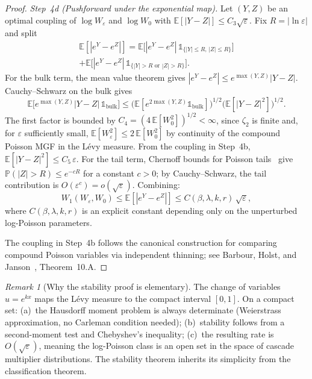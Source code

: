 \documentclass[12pt]{amsart}
\theoremstyle{definition}
\theoremstyle{remark}
\newtheorem*{remark}{Remark}
\begin{document}
\begin{proof}
\textit{Step~4d (Pushforward under the exponential map).}  Let
$(Y,Z)$ be an optimal coupling of $\log W_\varepsilon$ and
$\log W_0$ with
$\mathbb{E}[|Y-Z|] \leq C_3\sqrt{\varepsilon}$.
Fix $R = |\ln\varepsilon|$ and split
\begin{multline*}
  \mathbb{E}[|e^Y - e^Z|]
  = \mathbb{E}\bigl[|e^Y - e^Z|\,
    \mathds{1}_{\{|Y|\leq R,\,|Z|\leq R\}}\bigr] \\
  + \mathbb{E}\bigl[|e^Y - e^Z|\,
    \mathds{1}_{\{|Y|>R \text{ or } |Z|>R\}}\bigr].
\end{multline*}
For the bulk term, the mean value theorem gives $|e^Y - e^Z| \leq
e^{\max(Y,Z)}|Y-Z|$.  Cauchy--Schwarz on the bulk gives
\[
  \mathbb{E}\bigl[e^{\max(Y,Z)}|Y\!-\!Z|\,
  \mathds{1}_{\text{bulk}}\bigr]
  \leq
  \bigl(\mathbb{E}[e^{2\max(Y,Z)}
  \mathds{1}_{\text{bulk}}]\bigr)^{1/2}
  \bigl(\mathbb{E}[|Y\!-\!Z|^2]\bigr)^{1/2}.
\]
The first factor is bounded by $C_4 =
(4\,\mathbb{E}[W_0^2])^{1/2} < \infty$, since $\zeta_2$ is finite
and, for $\varepsilon$ sufficiently small,
$\mathbb{E}[W_\varepsilon^2] \leq 2\,\mathbb{E}[W_0^2]$ by
continuity of the compound Poisson MGF in the L\'evy measure.  From
the coupling in Step~4b, $\mathbb{E}[|Y-Z|^2] \leq
C_5\,\varepsilon$.  For the tail term, Chernoff bounds for Poisson
tails~\cite{BLM13} give $\mathbb{P}(|Z| > R) \leq e^{-cR}$ for a
constant $c > 0$; by Cauchy--Schwarz, the tail contribution is
$O(\varepsilon^c) = o(\sqrt{\varepsilon})$.  Combining:
\[
  W_1(W_\varepsilon, W_0)
  \leq \mathbb{E}[|e^Y - e^Z|]
  \leq C(\beta,\lambda,k,r)\,\sqrt{\varepsilon},
\]
where $C(\beta,\lambda,k,r)$ is an explicit constant depending only
on the unperturbed log-Poisson parameters.

The coupling in Step~4b follows the canonical construction for
comparing compound Poisson variables via independent thinning; see
Barbour, Holst, and Janson~\cite{BHJ92}, Theorem~10.A.
\end{proof}


\begin{remark}[Why the stability proof is elementary]
The change of variables $u = e^{kx}$ maps the L\'evy measure to the
compact interval $[0,1]$.  On a compact set: (a)~the Hausdorff moment
problem is always determinate (Weierstrass approximation, no Carleman
condition needed); (b)~stability follows from a second-moment test and
Chebyshev's inequality; (c)~the resulting rate is
$O(\sqrt{\varepsilon})$, meaning the log-Poisson class is an open set
in the space of cascade multiplier distributions.  The stability
theorem inherits its simplicity from the classification theorem.
\end{remark}
\end{document}
